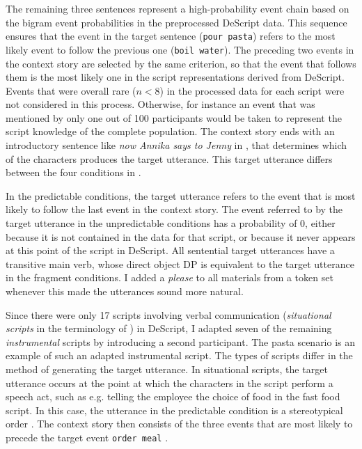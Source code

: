 %
The remaining three sentences represent a high-probability event chain based on the bigram event probabilities in the preprocessed DeScript data. This sequence ensures that the event in the target sentence \Last[a] (\texttt{pour pasta}) refers to the most likely event to follow the previous one (\texttt{boil water}). The preceding two events in the context story are selected by the same criterion, so that the event that follows them is the most likely one in the script representations derived from DeScript. Events that were overall rare ($n < 8$) in the processed data for each script were not considered in this process. Otherwise, for instance an event that was mentioned by only one out of 100 participants would be taken to represent the script knowledge of the complete population. The context story ends with an introductory sentence like \textit{now Annika says to Jenny} in \Last, that determines which of the characters produces the target utterance. This target utterance differs between the four conditions in \Last[a-d].

In the predictable conditions, the target utterance refers to the event that is most likely to follow the last event in the context story. The event referred to by the target utterance in the unpredictable conditions has a probability of 0, either because it is not contained in the data for that script, or because it never appears at this point of the script in DeScript. All sentential target utterances have a transitive main verb, whose direct object DP is equivalent to the target utterance in the fragment conditions. I added a \textit{please} to all materials from a token set whenever this made the utterances sound more natural.

Since there were only 17 scripts involving verbal communication (\textit{situational scripts} in the terminology of \citet{schank.abelson1977}) in DeScript, I adapted seven of the remaining \textit{instrumental} scripts by introducing a second participant. The pasta scenario is an example of such an adapted instrumental script. The types of scripts differ in the method of generating the target utterance. In situational scripts, the target utterance occurs at the point at which the characters in the script perform a speech act, such as e.g. telling the employee the choice of food in the fast food script. In this case, the utterance in the predictable condition is a stereotypical order \Next. The context story then consists of the three events that are most likely to precede the target event \texttt{order meal} \NNext.

